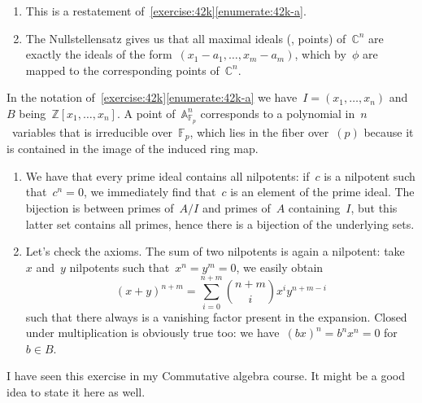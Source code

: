 \begin{exercise} %
  \begin{enumerate}
    \item This is a restatement of~\autoref{exercise:42k}\ref{enumerate:42k-a}.

    \item The Nullstellensatz gives us that all maximal ideals (\ie, points) of~$\mathbb{C}^n$ are exactly the ideals of the form~$(x_1-a_1,\ldots,x_m-a_m)$, which by~$\phi$ are mapped to the corresponding points of~$\mathbb{C}^n$.
  \end{enumerate}
\end{exercise}

\begin{exercise} %
  In the notation of~\autoref{exercise:42k}\ref{enumerate:42k-a} we have~$I=(x_1,\ldots,x_n)$ and~$B$ being~$\mathbb{Z}[x_1,\ldots,x_n]$. A point of~$\mathbb{A}_{\mathbb{F}_p}^n$ corresponds to a polynomial in~$n$~variables that is irreducible over~$\mathbb{F}_p$, which lies in the fiber over~$(p)$ because it is contained in the image of the induced ring map.
\end{exercise}

\begin{exercise}
  \label{exercise:42o}
  \begin{enumerate}
    \item We have that every prime ideal contains all nilpotents: if~$c$ is a nilpotent such that~$c^n=0$, we immediately find that~$c$ is an element of the prime ideal. The bijection is between primes of~$A/I$ and primes of~$A$ containing~$I$, but this latter set contains all primes, hence there is a bijection of the underlying sets.

    \item\label{enumerate:42o-b} Let's check the axioms. The sum of two nilpotents is again a nilpotent: take~$x$ and~$y$ nilpotents such that~$x^n=y^m=0$, we easily obtain
      \begin{equation}
        (x+y)^{n+m}=\sum_{i=0}^{n+m}\binom{n+m}{i}x^iy^{n+m-i}
      \end{equation}
      such that there always is a vanishing factor present in the expansion. Closed under multiplication is obviously true too: we have~$(bx)^n=b^nx^n=0$ for~$b\in B$.
  \end{enumerate}
\end{exercise}

\begin{exercise} %
  I have seen this exercise in my Commutative algebra course. It might be a good idea to state it here as well.
\end{exercise}

